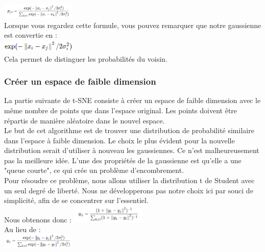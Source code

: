 \\
\includegraphics[width=100pt]{./img/reduction_dim/t_sne/eq_prob_8.png}
\\
Lorsque vous regardez cette formule, vous pouvez remarquer que notre gaussienne est convertie en : 
\\
\includegraphics[width=100pt]{./img/reduction_dim/t_sne/eq_prob_9.png}
\\
Cela permet de distinguer les probabilités du voisin.





\subsubsection*{Créer un espace de faible dimension}
La partie suivante de t-SNE consiste à créer un espace de faible dimension avec le même nombre de points que dans l'espace original. Les points doivent être répartis de manière aléatoire dans le nouvel espace. 
\\
Le but de cet algorithme est de trouver une distribution de probabilité similaire dans l'espace à faible dimension. Le choix le plus évident pour la nouvelle distribution serait d'utiliser à nouveau les gaussiennes. Ce n'est malheureusement pas la meilleure idée. L'une des propriétés de la gaussienne est qu'elle a une "queue courte", ce qui crée un problème d'encombrement.
\\
Pour résoudre ce problème, nous allons utiliser la distribution t de Student avec un seul degré de liberté. Nous ne développerons pas notre choix ici par souci de simplicité, afin de se concentrer sur l'essentiel.
\\
Nous obtenons donc :
\includegraphics[width=100pt]{./img/reduction_dim/t_sne/eq_red_dim_1.png}
\\
Au lieu de :
\\
\includegraphics[width=100pt]{./img/reduction_dim/t_sne/eq_red_dim_2.png}
\\

